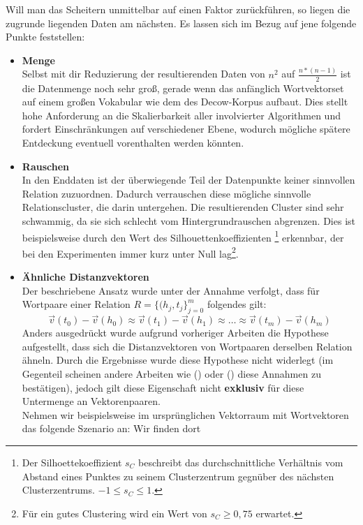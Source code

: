 Will man das Scheitern unmittelbar auf einen Faktor zurückführen, so liegen die zugrunde liegenden Daten am nächsten.
Es lassen sich im Bezug auf jene folgende Punkte feststellen:
\begin{itemize}
  \item \textbf{Menge}\\ Selbst mit dir Reduzierung der resultierenden Daten von $n^2$ auf $\frac{n*(n-1)}{2}$ ist die
  Datenmenge noch sehr groß, gerade wenn das anfänglich Wortvektorset auf einem großen Vokabular wie dem des Decow-Korpus aufbaut.
  Dies stellt hohe Anforderung an die Skalierbarkeit aller involvierter Algorithmen und fordert Einschränkungen auf verschiedener
  Ebene, wodurch mögliche spätere Entdeckung eventuell vorenthalten werden könnten.
  \item \textbf{Rauschen}\\ In den Enddaten ist der überwiegende Teil der Datenpunkte keiner sinnvollen Relation zuzuordnen.
  Dadurch verrauschen diese mögliche sinnvolle Relationscluster, die darin untergehen. Die resultierenden Cluster sind sehr
  schwammig, da sie sich schlecht vom Hintergrundrauschen abgrenzen. Dies ist beispielsweise durch den Wert des Silhouettenkoeffizienten
  \footnote{Der Silhoettekoeffizient $s_C$ beschreibt das durchschnittliche Verhältnis vom Abstand eines Punktes zu seinem Clusterzentrum gegnüber
  des nächsten Clusterzentrums. $-1 \leq s_C \leq 1$.}
  erkennbar, der bei den Experimenten immer kurz unter Null lag\footnote{Für ein gutes Clustering wird ein Wert von $s_C \geq 0,75$
  erwartet.}.
  \item \textbf{Ähnliche Distanzvektoren}\\
  Der beschriebene Ansatz wurde unter der Annahme verfolgt, dass für Wortpaare einer Relation $R=\{(h_j, t_j\}_{j=0}^m$
  folgendes gilt:
  \begin{equation}
    \vec{v}(t_0) - \vec{v}(h_0) \approx \vec{v}(t_1) - \vec{v}(h_1) \approx \ldots \approx \vec{v}(t_m) - \vec{v}(h_m)
  \end{equation}
  Anders ausgedrückt wurde aufgrund vorheriger Arbeiten die Hypothese aufgestellt, dass sich die Distanzvektoren von
  Wortpaaren derselben Relation ähneln. Durch die Ergebnisse wurde diese Hypothese nicht widerlegt (im Gegenteil scheinen
  andere Arbeiten wie (\cite{bordes2013translating}) oder (\cite{lin2015learning}) diese Annahmen zu bestätigen), jedoch
  gilt diese Eigenschaft nicht \textbf{exklusiv} für diese Untermenge an Vektorenpaaren.\\
  Nehmen wir beispielsweise im ursprünglichen Vektorraum mit Wortvektoren das folgende Szenario an: Wir finden dort

\end{itemize}
